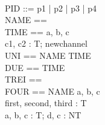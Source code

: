 \begin{circus}
	\\
   PID ::= p1 | p2 | p3 | p4\\
	\circchanset NAME == \lchanset \rchanset\\
	\circchanset TIME == \lchanset a, b, c \rchanset\\
	\circchannel [T]c1, c2 : \power T; newchannel\\
	\circchanset UNI == NAME \union TIME\\
	\circchanset DUE == \lchanset \rchanset \intersect TIME\\
	\circchanset TREI == \lchanset \rchanset \circhide \lchanset \rchanset\\
	\circchanset FOUR == NAME \circhide \lchanset a, b, c \rchanset\\
	\circchannel first, second, third : T\\
	\circchannel a, b, c : T; d, c : NT\\
\end{circus}

